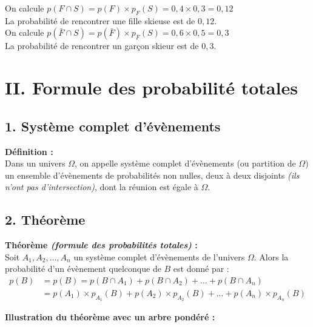 \documentclass[11pt,a4paper]{article}
\begin{document}
On calcule $p(F\cap S)=p(F)\times p_F(S)=0,4\times0,3=0,12$ \\
La probabilité de rencontrer une fille skieuse est de $0,12$. \\

On calcule $p(\bar F\cap S)=p(\bar F)\times p_{\bar{F}}(S)=0,6\times0,5=0,3$ \\
La probabilité de rencontrer un garçon skieur est de $0,3$.

\section*{II. Formule des probabilité totales}

\subsection*{1. Système complet d'évènements}

\begin{mdframed}[style=definitionStyle]
  \textbf{Définition :} ~\\
  Dans un univers $\Omega$, on appelle système complet d'évènements (ou partition de $\Omega$) un ensemble d'évènements de probabilités non nulles, deux à deux disjoints \emph{(ils n'ont pas d'intersection)}, dont la réunion est égale à $\Omega$.
\end{mdframed}

\subsection*{2. Théorème}

\begin{mdframed}[style=proprieteStyle]
  \textbf{Théorème \emph{(formule des probabilités totales)} :} ~\\
  Soit $A_1,A_2,\dots,A_n$ un système complet d'évènements de l'univers $\Omega$.
  Alors la probabilité d'un évènement quelconque de $B$ est donné par :
  \begin{equation*}
    \begin{split}
      p(B)&=p(B)=p(B\cap A_1)+p(B\cap A_2)+\dots+p(B\cap A_n)\\
      &= p(A_1)\times p_{A_1}(B)+p(A_2)\times p_{A_2}(B)+...+p(A_n)\times p_{A_n}(B)
    \end{split}
  \end{equation*}
\end{mdframed}

\textbf{Illustration du théorème avec un arbre pondéré :} ~\\
\end{document}
